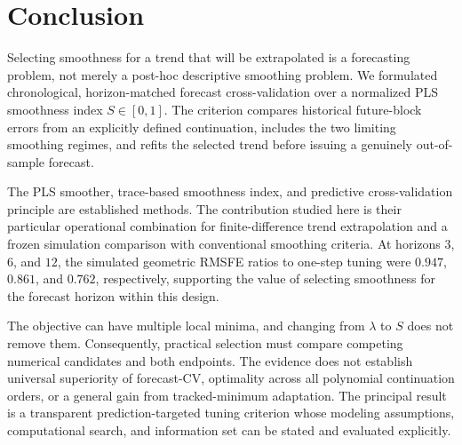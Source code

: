\section{Conclusion}

Selecting smoothness for a trend that
will be extrapolated is a forecasting
problem, not merely a post-hoc
descriptive smoothing problem.
We formulated chronological,
horizon-matched forecast
cross-validation over a normalized
PLS smoothness index $S\in[0,1]$.
The criterion compares historical
future-block errors from an explicitly
defined continuation, includes the
two limiting smoothing regimes, and
refits the selected trend before
issuing a genuinely out-of-sample
forecast.

The PLS smoother, trace-based
smoothness index, and predictive
cross-validation principle are
established methods. The contribution
studied here is their particular
operational combination for
finite-difference trend extrapolation
and a frozen simulation comparison
with conventional smoothing criteria.
At horizons $3$, $6$, and $12$,
the simulated geometric RMSFE
ratios to one-step tuning were
$0.947$, $0.861$, and $0.762$,
respectively, supporting the value
of selecting smoothness for the
forecast horizon within this design.

The objective can have multiple
local minima, and changing from
$\lambda$ to $S$ does not remove them.
Consequently, practical selection
must compare competing numerical
candidates and both endpoints.
The evidence does not establish
universal superiority of forecast-CV,
optimality across all polynomial
continuation orders, or a general
gain from tracked-minimum adaptation.
The principal result is a transparent
prediction-targeted tuning criterion
whose modeling assumptions,
computational search, and
information set can be stated
and evaluated explicitly.
